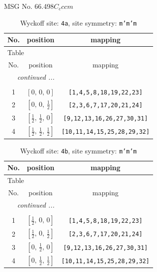 \documentclass[fleqn,8pt]{jsarticle}
\begin{document}
\setcounter{MaxMatrixCols}{32}

\renewcommand{\tablename}{Table~}
\renewcommand{\figurename}{Figure~}
\begin{center}
\LARGE
MSG No. 66.498\quad$C_{c}ccm$
\end{center}
\renewcommand{\arraystretch}{1.2}
\begin{longtable}{ccc}
\caption{Wyckoff site: {\tt 4a}, site symmetry: {\tt m'm'm}}
 \\
 \hline \hline
No. & position & mapping \\ \hline \endfirsthead

\multicolumn{2}{l}{\tablename\ \thetable{}} \\
 \hline \hline
No. & position & mapping \\ \hline \endhead

 \hline \hline
\multicolumn{2}{r}{\footnotesize\it continued ...} \\ \endfoot

 \hline \hline
\multicolumn{2}{r}{} \\ \endlastfoot

1 & $\left[ 0,\, 0,\, 0 \right]$ & {\tt [1,4,5,8,18,19,22,23]} \\ \hline
2 & $\left[ 0,\, 0,\, \frac{1}{2} \right]$ & {\tt [2,3,6,7,17,20,21,24]} \\ \hline
3 & $\left[ \frac{1}{2},\, \frac{1}{2},\, 0 \right]$ & {\tt [9,12,13,16,26,27,30,31]} \\ \hline
4 & $\left[ \frac{1}{2},\, \frac{1}{2},\, \frac{1}{2} \right]$ & {\tt [10,11,14,15,25,28,29,32]} \\
\end{longtable}
\renewcommand{\arraystretch}{1.2}
\begin{longtable}{ccc}
\caption{Wyckoff site: {\tt 4b}, site symmetry: {\tt m'm'm}}
 \\
 \hline \hline
No. & position & mapping \\ \hline \endfirsthead

\multicolumn{2}{l}{\tablename\ \thetable{}} \\
 \hline \hline
No. & position & mapping \\ \hline \endhead

 \hline \hline
\multicolumn{2}{r}{\footnotesize\it continued ...} \\ \endfoot

 \hline \hline
\multicolumn{2}{r}{} \\ \endlastfoot

1 & $\left[ \frac{1}{2},\, 0,\, 0 \right]$ & {\tt [1,4,5,8,18,19,22,23]} \\ \hline
2 & $\left[ \frac{1}{2},\, 0,\, \frac{1}{2} \right]$ & {\tt [2,3,6,7,17,20,21,24]} \\ \hline
3 & $\left[ 0,\, \frac{1}{2},\, 0 \right]$ & {\tt [9,12,13,16,26,27,30,31]} \\ \hline
4 & $\left[ 0,\, \frac{1}{2},\, \frac{1}{2} \right]$ & {\tt [10,11,14,15,25,28,29,32]} \\
\end{longtable}
\end{document}
